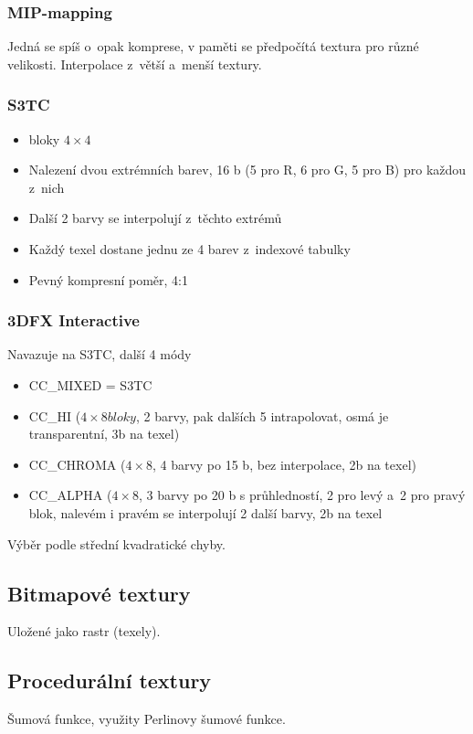 \subsubsection{MIP-mapping}
Jedná se spíš o~opak komprese, v paměti se předpočítá textura pro různé velikosti. Interpolace z~větší a~menší textury.

\subsubsection{S3TC}
\begin{itemize}
    \item bloky \(4\times4\)
    \item Nalezení dvou extrémních barev, 16 b (5 pro R, 6 pro G, 5 pro B) pro každou z~nich
    \item Další 2 barvy se interpolují z~těchto extrémů
    \item Každý texel dostane jednu ze 4 barev z~indexové tabulky
    \item Pevný kompresní poměr, 4:1
\end{itemize}

\subsubsection{3DFX Interactive}
Navazuje na S3TC, další 4 módy
\begin{itemize}
    \item CC\_MIXED = S3TC
    \item CC\_HI (\(4\times8 bloky\),  2 barvy, pak dalších 5 intrapolovat, osmá je transparentní, 3b na texel)
    \item CC\_CHROMA (\(4\times8\), 4 barvy po 15 b, bez interpolace, 2b na texel)
    \item CC\_ALPHA (\(4\times8\), 3 barvy po 20 b s průhledností, 2 pro levý a~2 pro pravý blok, nalevém i pravém se interpolují 2 další barvy, 2b na texel
\end{itemize}

Výběr podle střední kvadratické chyby.

\subsection{Bitmapové textury}
Uložené jako rastr (texely).

\subsection{Procedurální textury}
Šumová funkce, využity Perlinovy šumové funkce.

